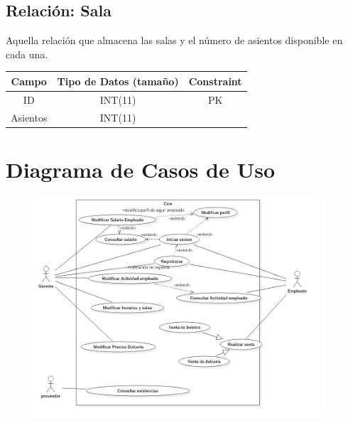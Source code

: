 \documentclass[12pt, fleqn]{report}                             %
\begin{document}
        \subsection*{Relación: Sala}

            Aquella relación que almacena las salas y el número de asientos disponible
            en cada una.

            \vspace{2em}

            \small{
            \begin{tabular}{| c | c | c |}
                \hline
                \textbf{Campo} & \textbf{Tipo de Datos (tamaño)} & \textbf{Constraint} \\[0.5ex] 
                \hline\hline
                
                ID          & INT(11)       & PK                    \\
                Asientos    & INT(11)       &                       \\
                \hline
            \end{tabular}
            }










    \clearpage
    \section{Diagrama de Casos de Uso}

        \begin{figure}[h]
            \centering
            \includegraphics[width=0.95\textwidth]{DiagramasDeCasosDeUso}
        \end{figure}
\end{document}
